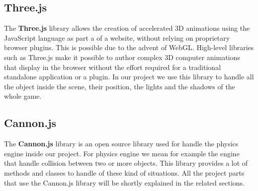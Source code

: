 \documentclass[a4paper, 11pt, titlepage]{report}
\begin{document}
	 	\subsection{Three.js}
		    \par The \textbf{Three.js} library allows the creation of accelerated 3D animations using the JavaScript language as part a of a website, without relying on proprietary browser plugins. This is possible due to the advent of WebGL.
		    High-level libraries such as Three.js make it possible to author complex 3D computer animations that display in the browser without the effort required for a traditional standalone application or a plugin.
		    In our project we use this library to handle all the object inside the scene, their position, the lights and the shadows of the whole game.
		\subsection{Cannon.js}
		    \par The \textbf{Cannon.js} library is an open source library used for handle the physics engine inside our project. For physics engine we mean for example the engine that handle collision between two or more objects. This library provides a lot of methods and classes to handle of these kind of situations. All the project parts that use the Cannon.js library will be shortly explained in the related sections.

\end{document}

